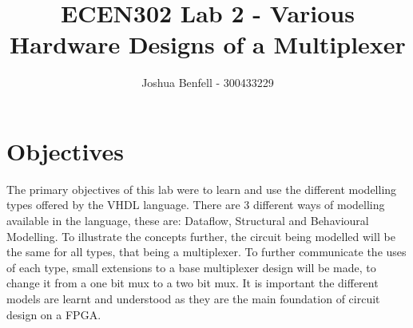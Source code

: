 \documentclass[a4paper, 12pt]{article}
\title{ECEN302 Lab 2 - Various Hardware Designs of a Multiplexer}
\author{Joshua Benfell - 300433229}
\begin{document}
	\maketitle
	
	\section{Objectives}
		The primary objectives of this lab were to learn and use the different modelling types offered by the VHDL language. There are 3 different ways of modelling available in the language, these are: Dataflow, Structural and Behavioural Modelling. To illustrate the concepts further, the circuit being modelled will be the same for all types, that being a multiplexer. To further communicate the uses of each type, small extensions to a base multiplexer design will be made, to change it from a one bit mux to a two bit mux. It is important the different models are learnt and understood as they are the main foundation of circuit design on a FPGA.
\end{document}

